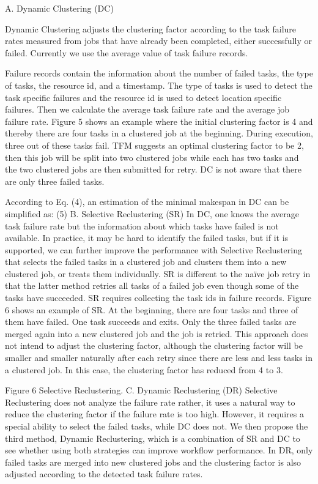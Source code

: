 \documentclass{IOS-Book-Article}
\begin{document}
A.	Dynamic Clustering (DC)

Dynamic Clustering adjusts the clustering factor according to the task failure rates measured from jobs that have already been completed, either successfully or failed. Currently we use the average value of task failure records. 
 
Failure records contain the information about the number of failed tasks, the type of tasks, the resource id, and a timestamp. The type of tasks is used to detect the task specific failures and the resource id is used to detect location specific failures. Then we calculate the average task failure rate and the average job failure rate. Figure 5 shows an example where the initial clustering factor is 4 and thereby there are four tasks in a clustered job at the beginning. During execution, three out of these tasks fail. TFM suggests an optimal clustering factor to be 2, then this job will be split into two clustered jobs while each has two tasks and the two clustered jobs are then submitted for retry.  DC is not aware that there are only three failed tasks. 

According to Eq. (4), an estimation of the minimal makespan in DC can be simplified as:
                                             (5)
B.	Selective Reclustering (SR)
In DC, one knows the average task failure rate but the information about which tasks have failed is not available. In practice, it may be hard to identify the failed tasks, but if it is supported, we can further improve the performance with Selective Reclustering that selects the failed tasks in a clustered job and clusters them into a new clustered job, or treats them individually. SR is different to the naïve job retry in that the latter method retries all tasks of a failed job even though some of the tasks have succeeded. SR requires collecting the task ids in failure records. 
Figure 6 shows an example of SR. At the beginning, there are four tasks and three of them have failed. One task succeeds and exits. Only the three failed tasks are merged again into a new clustered job and the job is retried. This approach does not intend to adjust the clustering factor, although the clustering factor will be smaller and smaller naturally after each retry since there are less and less tasks in a clustered job. In this case, the clustering factor has reduced from 4 to 3.
 
Figure 6	Selective Reclustering.
C.	Dynamic Reclustering (DR)
Selective Reclustering does not analyze the failure rate rather, it uses a natural way to reduce the clustering factor if the failure rate is too high. However, it requires a special ability to select the failed tasks, while DC does not. We then propose the third method, Dynamic Reclustering, which is a combination of SR and DC to see whether using both strategies can improve workflow performance. In DR, only failed tasks are merged into new clustered jobs and the clustering factor is also adjusted according to the detected task failure rates.
 
\end{document}
